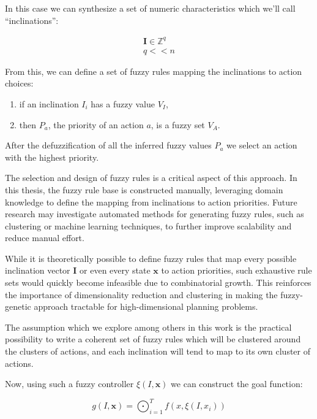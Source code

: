 \documentclass[11pt, a4paper]{article}
\begin{document}
	In this case we can synthesize a set of numeric characteristics which we'll call ``inclinations'':
	
	\begin{eqnarray}
		\mathbf{I} \in \mathbb{Z}^q\\
		q << n \label{q<<n}
	\end{eqnarray}

	From this, we can define a set of fuzzy rules\cite{ray2014softcomputing} mapping the inclinations to action choices:

	\begin{enumerate}
		\item if an inclination $I_i$ has a fuzzy value $V_I$,
		\item then $P_a$, the priority of an action $a$, is a fuzzy set $V_A$.
	\end{enumerate}
	
	After the defuzzification of all the inferred fuzzy values $P_a$ we select an action with the highest priority.
	
	The selection and design of fuzzy rules is a critical aspect of this approach.
	In this thesis, the fuzzy rule base is constructed manually, leveraging domain knowledge to define the mapping from inclinations to action priorities.
	Future research may investigate automated methods for generating fuzzy rules, such as clustering or machine learning techniques, to further improve scalability and reduce manual effort.

	While it is theoretically possible to define fuzzy rules that map every possible inclination vector $\mathbf{I}$ or even every state $\mathbf{x}$ to action priorities, such exhaustive rule sets would quickly become infeasible due to combinatorial growth.
	This reinforces the importance of dimensionality reduction and clustering in making the fuzzy-genetic approach tractable for high-dimensional planning problems.

	The assumption which we explore among others in this work is the practical possibility to write a coherent set of fuzzy rules which will be clustered around the clusters of actions, and each inclination will tend to map to its own cluster of actions.
	
	Now, using such a fuzzy controller $\xi(I, \mathbf{x})$ we can construct the goal function:
	
	\begin{equation}
		g(I, \mathbf{x}) = \bigodot_{i=1}^{T} f(x, \xi(I, x_i))
	\end{equation}
	
\end{document}
